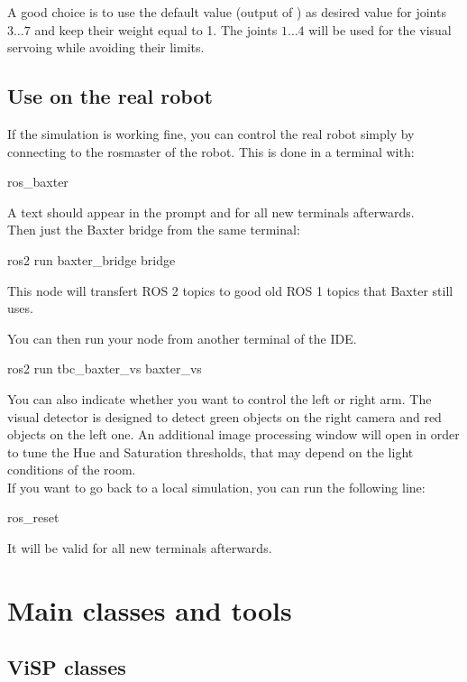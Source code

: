 \documentclass{ecnreport}
\begin{document}
A good choice is to use the default value (output of ) as desired value for joints $3\hdots7$ and keep their weight equal to 1.
The joints $1\hdots 4$ will be used for the visual servoing while avoiding their limits.

\subsection{Use on the real robot}

If the simulation is working fine, you can control the real robot simply by connecting to the rosmaster of the robot. This is done in a terminal with:
\begin{bashcodelarge}
 ros_baxter
\end{bashcodelarge}A \okt{[baxter]} text should appear in the prompt and for all new terminals afterwards.\\
Then just the Baxter bridge from the same terminal:
\begin{bashcodelarge}
 ros2 run baxter_bridge bridge
\end{bashcodelarge}This node will transfert ROS 2 topics to good old ROS 1 topics that Baxter still uses.

You can then run your node from another terminal of the IDE.
\begin{bashcodelarge}
 ros2 run tbc_baxter_vs baxter_vs
\end{bashcodelarge}

You can also indicate whether you want to control the left or right arm. The visual detector is designed to detect green objects on the right camera and red objects on the left one. An additional image processing window will open in order to tune the Hue and Saturation thresholds, that may depend on the light conditions of the room.\\

If you want to go back to a local simulation, you can run the following line:
\begin{bashcodelarge}
 ros_reset
\end{bashcodelarge} It will be valid for all new terminals afterwards.

\appendix

\section{Main classes and tools}\label{sec:classes}

\subsection{ViSP classes}
\end{document}
